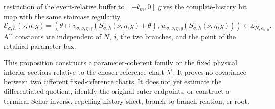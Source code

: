 \begin{proposition}
\begin{equation}
\end{equation}
restriction of the event-relative buffer to $[-\theta_m,0]$ gives the
complete-history hit map with the same staircase regularity,
\begin{equation}
 \mathcal E_{\sigma,h}(\nu,\eta,g)
 =\left(\theta\longmapsto
       v_{\sigma,\nu,\eta,g}
          (S_{\sigma,h}(\nu,\eta,g)+\theta),
       \ w_{\sigma,\nu,\eta,g}
          (S_{\sigma,h}(\nu,\eta,g))\right)
 \in\Sigma_{N,e_{\sigma,h}}.                     \label{eq:parameter-coherent-hit-map}
\end{equation}
All constants are independent of $N$, $\delta$, the two branches, and the
point of the retained parameter box.

This proposition constructs a parameter-coherent family on the fixed
physical interior sections relative to the chosen reference chart
$\lambda^\circ$.  It proves no covariance between two different
fixed-reference charts.  It does not yet estimate the differentiated
quotient, identify the original outer endpoints, or construct a terminal
Schur inverse, repelling history sheet, branch-to-branch relation, or root.
\end{proposition}

